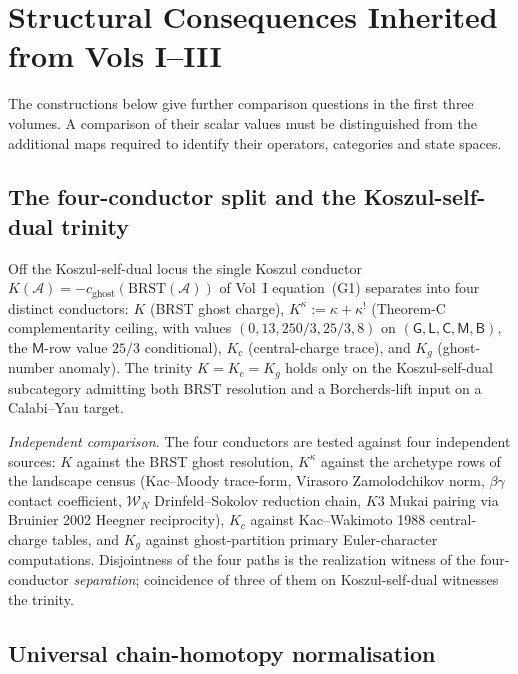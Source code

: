 \section{Structural Consequences Inherited from Vols I--III}
\label{v4-sec:architectural-sharpenings-inherited}

The constructions below give further comparison questions in the
first three volumes. A comparison of their scalar values must be
distinguished from the additional maps required to identify their
operators, categories and state spaces.

\subsection{The four-conductor split and the Koszul-self-dual trinity}
\label{v4-subsec:four-conductor-trinity}

Off the Koszul-self-dual locus the single Koszul conductor
\(K(\mathcal{A}) = -c_{\mathrm{ghost}}(\mathrm{BRST}(\mathcal{A}))\) of Vol~I
equation~(G1) separates into four distinct conductors: \(K\) (BRST
ghost charge), \(K^{\kappa} := \kappa+\kappa^{!}\) (Theorem-C
complementarity ceiling, with values
\((0,13,250/3,25/3,8)\) on
\((\mathsf G,\mathsf L,\mathsf C,\mathsf M,\mathsf B)\), the
\(\mathsf M\)-row value \(25/3\) conditional), \(K_c\)
(central-charge trace), and \(K_g\) (ghost-number anomaly). The trinity
\(K = K_c = K_g\) holds only on the Koszul-self-dual subcategory
admitting both BRST resolution and a Borcherds-lift input on a
Calabi--Yau target.

\noindent\emph{Independent comparison.} The four conductors are
tested against four independent sources: \(K\) against the BRST ghost
resolution, \(K^\kappa\) against the archetype rows of the landscape
census (Kac--Moody trace-form, Virasoro Zamolodchikov norm,
\(\beta\gamma\) contact coefficient, \(\mathcal{W}_N\) Drinfeld--Sokolov
reduction chain, \(K3\) Mukai pairing via Bruinier 2002 Heegner
reciprocity), \(K_c\) against Kac--Wakimoto 1988 central-charge tables,
and \(K_g\) against ghost-partition primary Euler-character
computations.
Disjointness of the four paths is the realization witness of the
four-conductor \emph{separation}; coincidence of three of them on
Koszul-self-dual witnesses the trinity.

\subsection{Universal chain-homotopy normalisation}
\label{v4-subsec:universal-chain-homotopy}

